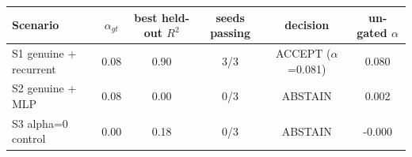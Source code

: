 \begin{tabular}{lccccc}
\toprule
Scenario & $\alpha_{gt}$ & best held-out $R^2$ & seeds passing & decision & un-gated $\alpha$ \\
\midrule
S1 genuine + recurrent & 0.08 & 0.90 & 3/3 & ACCEPT ($\alpha$=0.081) & 0.080 \\
S2 genuine + MLP & 0.08 & 0.00 & 0/3 & ABSTAIN & 0.002 \\
S3 alpha=0 control & 0.00 & 0.18 & 0/3 & ABSTAIN & -0.000 \\
\bottomrule
\end{tabular}
